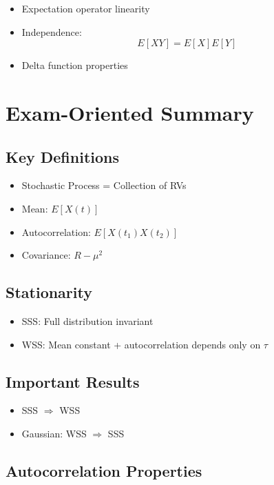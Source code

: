 \documentclass[11pt]{article}
\begin{document}
\begin{itemize}
    \item Expectation operator linearity
    \item Independence:
    \[
    E[XY] = E[X]E[Y]
    \]
    \item Delta function properties
\end{itemize}

\section{Exam-Oriented Summary}

\subsection{Key Definitions}

\begin{itemize}
    \item Stochastic Process = Collection of RVs
    \item Mean: $E[X(t)]$
    \item Autocorrelation: $E[X(t_1)X(t_2)]$
    \item Covariance: $R - \mu^2$
\end{itemize}

\subsection{Stationarity}

\begin{itemize}
    \item SSS: Full distribution invariant
    \item WSS: Mean constant + autocorrelation depends only on $\tau$
\end{itemize}

\subsection{Important Results}

\begin{itemize}
    \item SSS $\Rightarrow$ WSS
    \item Gaussian: WSS $\Rightarrow$ SSS
\end{itemize}

\subsection{Autocorrelation Properties}
\end{document}

